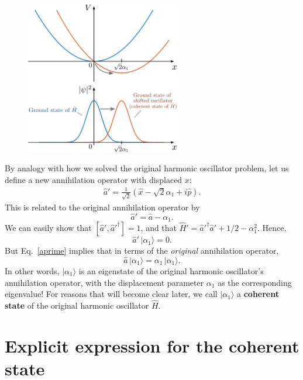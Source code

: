 \documentclass[prx,12pt]{revtex4-2}
\begin{document}
\begin{figure}[h]
  \centering\includegraphics[width=0.6\textwidth]{coherent_state}
\end{figure}

By analogy with how we solved the original harmonic oscillator
problem, let us define a new annihilation operator with displaced $x$:
\begin{align}
  \hat{a}' = \frac{1}{\sqrt{2}}\left(\hat{x} - \sqrt{2}\alpha_1 + i \hat{p}\right).
\end{align}
This is related to the original annihilation operator by
\begin{equation}
  \hat{a}' = \hat{a} - \alpha_1.
  \label{aprime}
\end{equation}
We can easily show that $[\hat{a}',\hat{a}'^\dagger] = 1$, and that
$\hat{H}' = \hat{a}'^\dagger \hat{a}' + 1/2 - \alpha_1^2$.  Hence,
\begin{equation}
  \hat{a}' \, |\alpha_1 \rangle = 0.
\end{equation}
But Eq.~\eqref{aprime} implies that in terms of the \textit{original}
annihilation operator,
\begin{equation}
  \hat{a}\, |\alpha_1\rangle = \alpha_1 \,|\alpha_1\rangle.
  \label{aeigenv}
\end{equation}
In other words, $|\alpha_1\rangle$ is an eigenstate of the original
harmonic oscillator's annihilation operator, with the displacement
parameter $\alpha_1$ as the corresponding eigenvalue!  For reasons
that will become clear later, we call $|\alpha_1\rangle$ a
\textbf{coherent state} of the original harmonic oscillator $\hat{H}$.

\section{Explicit expression for the coherent state}
\end{document}
